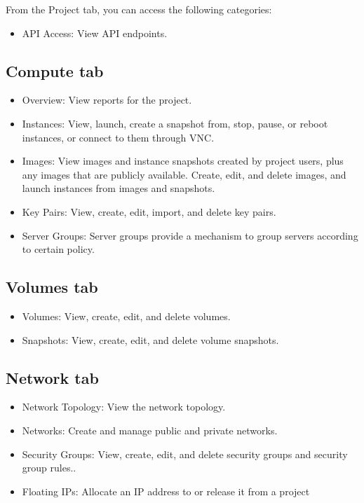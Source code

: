 From the Project tab, you can access the following categories:
\begin{itemize}
\item
  API Access: View API endpoints.
\end{itemize}

\subsection*{\texorpdfstring{Compute
tab}{Compute tab}}\label{compute-tab}

\begin{itemize}
\item
  Overview: View reports for the project.
\item
  Instances: View, launch, create a snapshot from, stop, pause, or
  reboot instances, or connect to them through VNC.
\item
  Images: View images and instance snapshots created by project users,
  plus any images that are publicly available. Create, edit, and delete
  images, and launch instances from images and snapshots.
\item
  Key Pairs: View, create, edit, import, and delete key pairs.
\item
  Server Groups: Server groups provide a mechanism to group servers according to certain policy.
\end{itemize}

\subsection*{\texorpdfstring{Volumes
tab}{Volumes tab}}\label{volumes-tab}

\begin{itemize}
\item
  Volumes: View, create, edit, and delete volumes.
\item
  Snapshots: View, create, edit, and delete volume snapshots.
\end{itemize}

\subsection*{\texorpdfstring{Network
tab}{Network tab}}\label{network-tab}

\begin{itemize}
\item
  Network Topology: View the network topology.
\item
  Networks: Create and manage public and private networks.
\item
  Security Groups: View, create, edit, and delete security groups and
  security group rules..
\item
  Floating IPs: Allocate an IP address to or release it from a project
\end{itemize}

